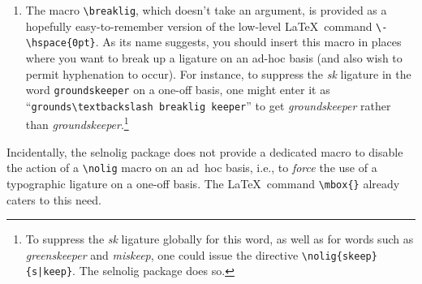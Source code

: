 \documentclass[12pt]{article}
\newcommand{\pkg}[1]{\textsf{#1}}
\newcommand{\cmmd}[1]{\texttt{\textbackslash #1}}
\begin{document}
\begin{enumerate}
Observe that we make use of the case sensitivity in the final \cmmd{nolig} instruction in order to avoid having it apply to words such as \enquote{Visumpflicht} (visa requirement). 

\item The macro \cmmd{breaklig}, which doesn't take an argument, is provided as a hopefully easy-to-remember version of the low-level \LaTeX\ command \Verb+\-\hspace{0pt}+. As its name suggests, you should insert this macro in places where you want to break up a ligature on an ad-hoc basis (and also wish to permit hyphenation to occur). For instance, to suppress the \emph{\mbox{sk}} ligature in the word \Verb+groundskeeper+ on a one-off basis, one might enter it as \enquote{\Verb+grounds\textbackslash breaklig keeper+} to get {\ebg \emph{groundskeeper} rather than \emph{ground\mbox{sk}eeper}.}\footnote{To suppress the {\ebg \emph{\mbox{sk}}} ligature globally for this word, as well as for words such as {\ebg \emph{greenskeeper}} and {\ebg \emph{miskeep}}, one could issue the directive \Verb+\nolig{skeep}{s|keep}+. The \pkg{selnolig} package does so.}

\end{enumerate}

Incidentally, the \pkg{selnolig} package does not provide a dedicated macro to disable the action of a \cmmd{nolig} macro on an ad~hoc basis, i.e., to \emph{force} the use of a typographic ligature on a one-off basis. The \LaTeX\ command \Verb+\mbox{}+ already caters to this need.
\end{document}
